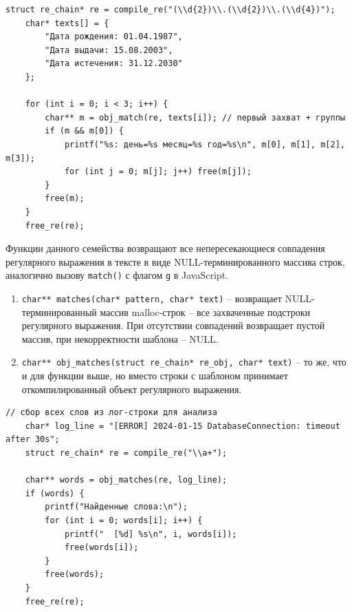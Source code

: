 \begin{lstlisting}[caption={Извлечение даты в формате ДД.ММ.ГГГГ из набора строк}]
	struct re_chain* re = compile_re("(\\d{2})\\.(\\d{2})\\.(\\d{4})");
	char* texts[] = {
		"Дата рождения: 01.04.1987",
		"Дата выдачи: 15.08.2003",
		"Дата истечения: 31.12.2030"
	};
	
	for (int i = 0; i < 3; i++) {
		char** m = obj_match(re, texts[i]); // первый захват + группы
		if (m && m[0]) {
			printf("%s: день=%s месяц=%s год=%s\n", m[0], m[1], m[2], m[3]);
			for (int j = 0; m[j]; j++) free(m[j]);
		}
		free(m);
	}
	free_re(re);
\end{lstlisting}


Функции данного семейства возвращают все непересекающиеся совпадения регулярного выражения в тексте в виде NULL-терминированного массива строк, аналогично вызову \verb`match()` с флагом \verb`g` в JavaScript.

\begin{enumerate}
	\item \verb`char** matches(char* pattern, char* text)` -- возвращает NULL-терминированный массив malloc-строк -- все захваченные подстроки регулярного выражения. При отсутствии совпадений возвращает пустой массив, при некорректности шаблона -- NULL.
	
	\item \verb`char** obj_matches(struct re_chain* re_obj, char* text)` -- то же, что и для функции выше, но вместо строки с шаблоном принимает откомпилированный объект регулярного выражения.
\end{enumerate}

\begin{lstlisting}[caption={Извлечение всех слов из текста}]
	// сбор всех слов из лог-строки для анализа
	char* log_line = "[ERROR] 2024-01-15 DatabaseConnection: timeout after 30s";
	struct re_chain* re = compile_re("\\a+");
	
	char** words = obj_matches(re, log_line);
	if (words) {
		printf("Найденные слова:\n");
		for (int i = 0; words[i]; i++) {
			printf("  [%d] %s\n", i, words[i]);
			free(words[i]);
		}
		free(words);
	}
	free_re(re);
\end{lstlisting}

